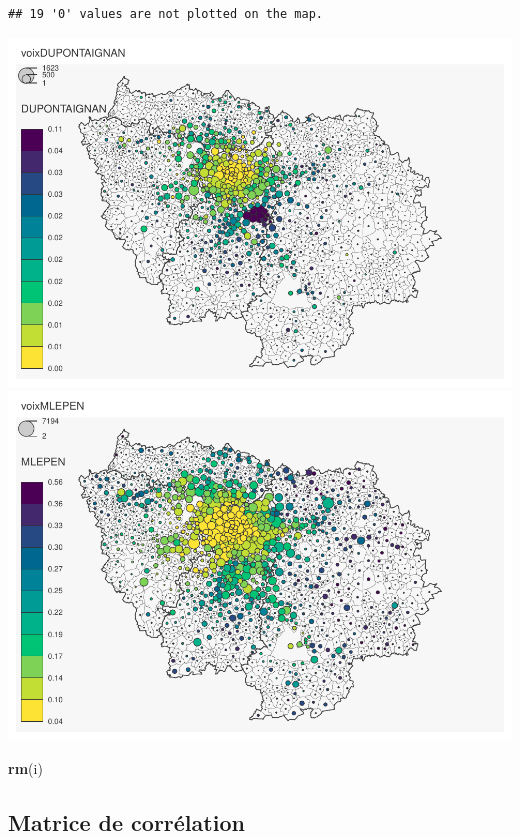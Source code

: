 \documentclass[
]{book}
\newenvironment{Shaded}{\begin{snugshade}}{\end{snugshade}}
\newcommand{\FunctionTok}[1]{\textcolor[rgb]{0.13,0.29,0.53}{\textbf{#1}}}
\newcommand{\NormalTok}[1]{#1}
\begin{document}
\begin{verbatim}
## 19 '0' values are not plotted on the map.
\end{verbatim}

\includegraphics{manuel_geo_quanti_files/figure-latex/unnamed-chunk-52-11.pdf} \includegraphics{manuel_geo_quanti_files/figure-latex/unnamed-chunk-52-12.pdf}

\begin{Shaded}
\begin{Highlighting}[]
\FunctionTok{rm}\NormalTok{(i)}
\end{Highlighting}
\end{Shaded}

\hypertarget{matrice-de-corruxe9lation}{%
\subsection{Matrice de corrélation}\label{matrice-de-corruxe9lation}}
\end{document}
